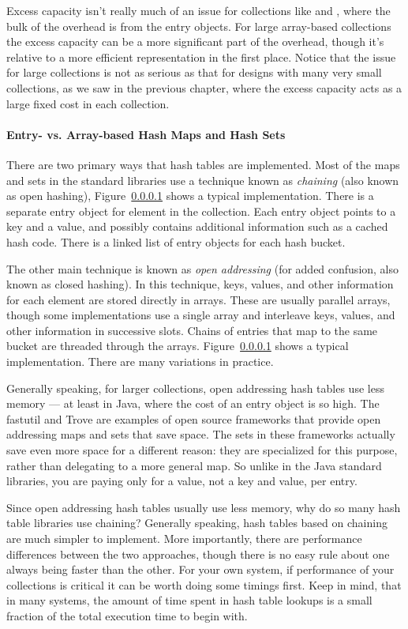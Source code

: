 Excess capacity isn't really much of an issue for collections like
 and , where the bulk of the overhead is from the entry objects.
For large array-based collections the excess capacity can be a more significant part of the overhead, 
though it's relative to a more efficient representation in the first place.
Notice that the issue for large collections is not as serious as that for
designs with many very small collections, as we saw
in the previous chapter, where the excess capacity acts as a large fixed cost in each collection.

\paragraph{Entry- vs. Array-based Hash Maps and Hash Sets}

There are two primary ways that hash tables are implemented. Most of the maps and sets
in the standard libraries use a technique known as \emph{chaining} (also
known as open hashing), Figure~\ref{} shows a typical
implementation. There is a separate entry object for element in the collection.
Each entry object points to a key and a value, and possibly contains
additional information such as a cached hash code. There is a linked list of
entry objects for each hash bucket.

The other main technique is known as \emph{open addressing} (for added
confusion, also known as closed hashing).  In this technique,
keys, values, and other information for each element are stored directly in
arrays. These are usually parallel arrays, though some implementations
use a single array and interleave keys, values, and other information in
successive slots. Chains of entries that map to the same bucket are threaded through the arrays.
Figure~\ref{} shows a typical implementation. There are many variations in
practice.

Generally speaking, for larger collections, open addressing hash tables use less
memory --- at least in Java, where the cost of an entry object is so high. The
fastutil and Trove are examples of open source frameworks that provide open
addressing maps and sets that save space. The sets in these frameworks actually
save even more space for a different reason: they are specialized for this
purpose, rather than delegating to a more general map. So unlike in the Java
standard libraries, you are paying only for a value, not a key and value, per entry.

Since open addressing hash tables usually use less memory, why do so many hash
table libraries use chaining? Generally speaking, hash tables based
on chaining are much simpler to implement. More importantly, there
are performance differences between the two approaches, though there is no easy
rule about one always being faster than the other. For your
own system, if performance of your collections is critical it can be worth doing
some timings first.  Keep in mind, that in many systems, the amount of time
spent in hash table lookups is a small fraction of the total execution time to begin with. 

